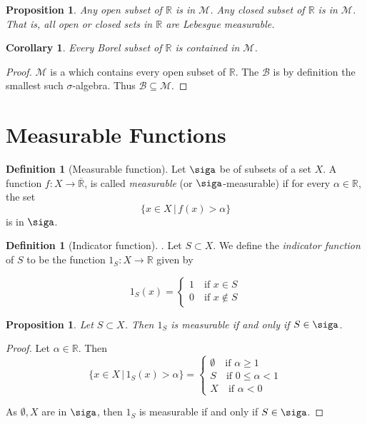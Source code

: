 \documentclass[10pt, oneside, reqno]{amsart}
\theoremstyle{plain}%
\newtheorem{prop}[thm]{Proposition}
\newtheorem*{cor}{Corollary}
\theoremstyle{definition}
\newtheorem{defn}[thm]{Definition}
\theoremstyle{remark}
\newcommand{\given}{ \, | \,}
\newcommand{\R}{\mathbb{R}}
\begin{document}
\begin{prop}
    Any open subset of $\R$ is in $\mathcal{M}$.  Any closed subset of $\R$ is in $\mathcal{M}$.  That is, all open or closed sets in $\R$ are Lebesgue measurable.
\end{prop}

\begin{cor}
    Every Borel subset of $\R$ is contained in $\mathcal{M}$.  
\end{cor}
\begin{proof}
    $\mathcal{M}$ is a \sig which contains every open subset of $\R$.  The \sig $\mathcal{B}$ is by definition the smallest such $\sigma$-algebra.  Thus $\mathcal{B} \subseteq \mathcal{M}$.
\end{proof}


\section{Measurable Functions} %
\label{sec:measurable_functions}
\newcommand{\Rbar}{\overline{\R}}

\begin{defn}[Measurable function]
    Let $\siga$ be \sig of subsets of a set $X$.  A function $f: X \rightarrow \Rbar$, is called \emph{measurable} (or $\siga$-measurable) if for every $\alpha \in \R$, the set \[
        \{ x \in X \given f(x) > \alpha \}
    \] is in $\siga$.
\end{defn}

\begin{defn}[Indicator function].  Let $S \subset X$.  We define the \emph{indicator function} of $S$ to be the function $1_S : X \rightarrow \R$ given by 

    \[ 1_S(x) = \begin{cases}
        1 \quad \text{if $x \in S$}\\
        0 \quad \text{if $x \notin S$}
    \end{cases}\]
\end{defn}

\begin{prop}
    Let $S \subset X$.  Then $1_S$ is measurable if and only if $S \in \siga$.  
\end{prop}
\begin{proof}
    Let $\alpha \in \R$.  Then \[
        \{ x \in X \given 1_S(x) > \alpha \} = \begin{cases}
            \emptyset \quad \text{if $\alpha \geq 1$}\\
            S \quad \text{if $0 \leq \alpha < 1$} \\
            X \quad \text{if $\alpha < 0$}
        \end{cases}
    \]
    
As $\emptyset, X$ are in $\siga$, then $1_S$ is measurable if and only if $S \in \siga$.
\end{proof}
\end{document}
